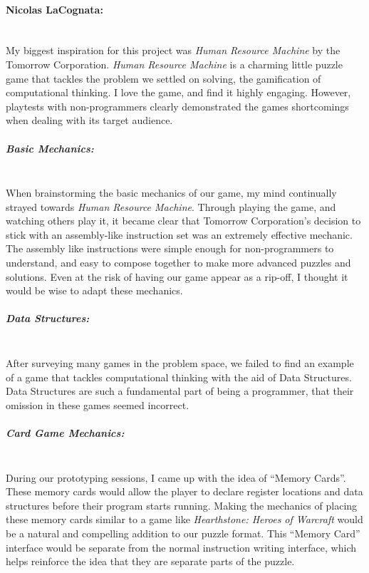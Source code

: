 \paragraph{Nicolas LaCognata:}\mbox{} \\
My biggest inspiration for this project was \textit{Human Resource Machine} by the Tomorrow Corporation.
\textit{Human Resource Machine} is a charming little puzzle game that tackles the problem we settled on solving,
the gamification of computational thinking. I love the game, and find it highly engaging. However, playtests
with non-programmers clearly demonstrated the games shortcomings when dealing with its target audience.

\subparagraph{Basic Mechanics:}\mbox{} \\
When brainstorming the basic mechanics of our game, my mind continually strayed towards \textit{Human Resource Machine}.
Through playing the game, and watching others play it, it became clear that Tomorrow Corporation's decision to stick with
an assembly-like instruction set was an extremely effective mechanic.\\

The assembly like instructions were simple enough for non-programmers to understand, and easy to compose together to make more
advanced puzzles and solutions. Even at the risk of having our game appear as a rip-off, I thought it would be wise to adapt
these mechanics.

\subparagraph{Data Structures:}\mbox{} \\
After surveying many games in the problem space, we failed to find an example of a game that tackles computational thinking
with the aid of Data Structures. Data Structures are such a fundamental part of being a programmer, that their omission in these
games seemed incorrect.

\subparagraph{Card Game Mechanics:}\mbox{} \\
During our prototyping sessions, I came up with the idea of “Memory Cards”.
These memory cards would allow the player to declare register locations and data
structures before their program starts running. Making the mechanics of placing these
memory cards similar to a game like \textit{Hearthstone: Heroes of Warcraft} would be
a natural and compelling addition to our puzzle format. This “Memory Card” interface
would be separate from the normal instruction writing interface, which helps reinforce
the idea that they are separate parts of the puzzle. \\

